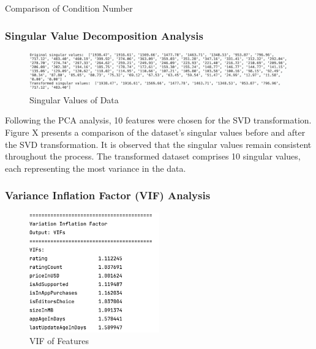 \begin{center}
Comparison of Condition Number
\end{center}


\subsubsection{Singular Value Decomposition Analysis}

\begin{figure}[h]
\centering
\includegraphics[width=\textwidth]{docs//assets/svd.png}
\caption{Singular Values of Data}
\end{figure}

Following the PCA analysis, 10 features were chosen for the SVD transformation. Figure X presents a comparison of the dataset's singular values before and after the SVD transformation. It is observed that the singular values remain consistent throughout the process. The transformed dataset comprises 10 singular values, each representing the most variance in the data.

\subsubsection{Variance Inflation Factor (VIF) Analysis}

\begin{figure}[h]
\centering
\includegraphics[width=0.5\textwidth]{docs//assets/vif.png}
\caption{VIF of Features}
\end{figure}

